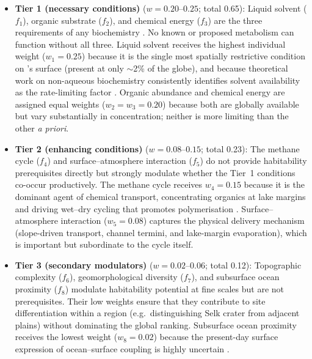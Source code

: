 \begin{itemize}
  \item \textbf{Tier 1 (necessary conditions)} ($w = 0.20$--$0.25$; total 0.65): Liquid solvent ($f_1$), organic substrate ($f_2$), and chemical energy ($f_3$) are the three requirements of any biochemistry \citep{McKaySmith2005,Benner2004}.  No known or proposed metabolism can function without all three.  Liquid solvent receives the highest individual weight ($w_1 = 0.25$) because it is the single most spatially restrictive condition on \titan{}'s surface (present at only $\sim$2\% of the globe), and because theoretical work on non-aqueous biochemistry consistently identifies solvent availability as the rate-limiting factor \citep{Stevenson2015,Benner2004}.  Organic abundance and chemical energy are assigned equal weights ($w_2 = w_3 = 0.20$) because both are globally available but vary substantially in concentration; neither is more limiting than the other \textit{a priori}.

  \item \textbf{Tier 2 (enhancing conditions)} ($w = 0.08$--$0.15$; total 0.23): The methane cycle ($f_4$) and surface--atmosphere interaction ($f_5$) do not provide habitability prerequisites directly but strongly modulate whether the Tier~1 conditions co-occur productively.  The methane cycle receives $w_4 = 0.15$ because it is the dominant agent of chemical transport, concentrating organics at lake margins and driving wet--dry cycling that promotes polymerisation \citep{MitchellLora2016}.  Surface--atmosphere interaction ($w_5 = 0.08$) captures the physical delivery mechanism (slope-driven transport, channel termini, and lake-margin evaporation), which is important but subordinate to the cycle itself.

  \item \textbf{Tier 3 (secondary modulators)} ($w = 0.02$--$0.06$; total 0.12): Topographic complexity ($f_6$), geomorphological diversity ($f_7$), and subsurface ocean proximity ($f_8$) modulate habitability potential at fine scales but are not prerequisites.  Their low weights ensure that they contribute to site differentiation within a region (e.g.\ distinguishing Selk crater from adjacent plains) without dominating the global ranking.  Subsurface ocean proximity receives the lowest weight ($w_8 = 0.02$) because the present-day surface expression of ocean--surface coupling is highly uncertain \citep{Hemingway2013}.
\end{itemize}

